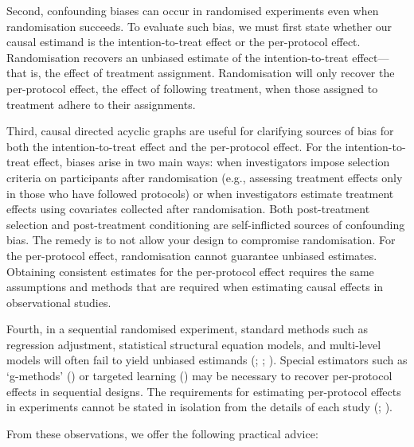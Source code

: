 \documentclass[
  single column]{article}
\begin{document}
Second, confounding biases can occur in randomised experiments even when
randomisation succeeds. To evaluate such bias, we must first state
whether our causal estimand is the intention-to-treat effect or the
per-protocol effect. Randomisation recovers an unbiased estimate of the
intention-to-treat effect---that is, the effect of treatment assignment.
Randomisation will only recover the per-protocol effect, the effect of
following treatment, when those assigned to treatment adhere to their
assignments.

Third, causal directed acyclic graphs are useful for clarifying sources
of bias for both the intention-to-treat effect and the per-protocol
effect. For the intention-to-treat effect, biases arise in two main
ways: when investigators impose selection criteria on participants after
randomisation (e.g., assessing treatment effects only in those who have
followed protocols) or when investigators estimate treatment effects
using covariates collected after randomisation. Both post-treatment
selection and post-treatment conditioning are self-inflicted sources of
confounding bias. The remedy is to not allow your design to compromise
randomisation. For the per-protocol effect, randomisation cannot
guarantee unbiased estimates. Obtaining consistent estimates for the
per-protocol effect requires the same assumptions and methods that are
required when estimating causal effects in observational studies.

Fourth, in a sequential randomised experiment, standard methods such as
regression adjustment, statistical structural equation models, and
multi-level models will often fail to yield unbiased estimands
(;
;
). Special
estimators such as `g-methods' () or targeted learning
() may be
necessary to recover per-protocol effects in sequential designs. The
requirements for estimating per-protocol effects in experiments cannot
be stated in isolation from the details of each study
(;
).

From these observations, we offer the following practical advice:
\end{document}
